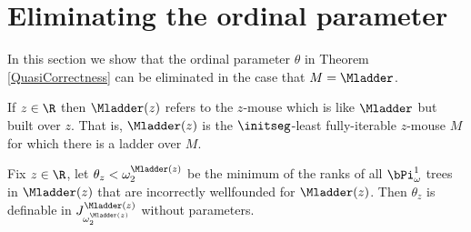 \documentclass[oneside,12pt]{amsart}
\begin{document}
\section{Eliminating the ordinal parameter}
\label{section:eliminate_ordinal_parameters}

In this section we show that the ordinal parameter $\theta$ in Theorem
\ref{QuasiCorrectness} can be eliminated in the case that $M=\Mladder$.

\begin{definition}
If $z\in\R$ then $\Mladder(z)$ refers to the $z$-mouse which is like $\Mladder$ but built over $z$.
That is, $\Mladder(z)$ is the $\initseg$-least fully-iterable $z$-mouse $M$ for which there is
a ladder over $M$.
\end{definition}

\begin{theorem}
Fix $z\in\R$, let  $\theta_z<\omega_2^{\Mladder(z)}$ be the
minimum of the ranks of all
$\bPi^1_{\omega}$ trees in $\Mladder(z)$ that are  incorrectly wellfounded for $\Mladder(z)$.
Then $\theta_z$ is definable in $J^{\Mladder(z)}_{\omega_2^{\Mladder(z)}}$ without parameters.
\end{theorem}
\end{document}
